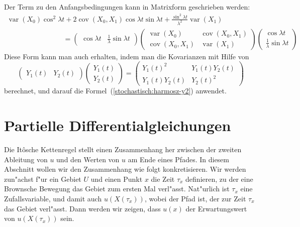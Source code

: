 Der Term zu den Anfangsbedingungen kann in Matrixform geschrieben
werden:
\begin{gather*}
\operatorname{var}(X_0)\cos^2\lambda t
+2\operatorname{cov}(X_0,X_1)\cos\lambda t\sin\lambda t
+
\frac{\sin^2\lambda t}{\lambda^2}\operatorname{var}(X_1)
\qquad
\qquad
\qquad
\qquad
\\
\qquad
\qquad
\qquad
\qquad
=
\begin{pmatrix}
\cos\lambda t&\frac1\lambda\sin\lambda t
\end{pmatrix}
\begin{pmatrix}
\operatorname{var}(X_0)    &\operatorname{cov}(X_0,X_1)\\
\operatorname{cov}(X_0,X_1)&\operatorname{var}(X_1)
\end{pmatrix}
\begin{pmatrix}
\cos\lambda t\\
\frac1\lambda\sin\lambda t
\end{pmatrix}
\end{gather*}
Diese Form kann man auch erhalten, indem man die Kovarianzen mit Hilfe von
\[
\begin{pmatrix} Y_1(t)&Y_2(t) \end{pmatrix}
\begin{pmatrix}
Y_1(t)\\
Y_2(t)
\end{pmatrix}
=
\begin{pmatrix}
Y_1(t)^2&Y_1(t)Y_2(t)\\
Y_1(t)Y_2(t)&Y_2(t)^2
\end{pmatrix}
\]
berechnet, und darauf die Formel~(\ref{stochastisch:harmosz-y2}) anwendet.

%
%
\section{Partielle Differentialgleichungen\label{section:pdgl}}
Die It\^osche Kettenregel stellt einen Zusammenhang her zwischen der zweiten
Ableitung von $u$ und den Werten von $u$ am Ende eines Pfades.
In diesem Abschnitt wollen wir den Zusammenhang wie folgt konkretisieren.
Wir werden zun"achst f"ur ein Gebiet $U$ und einen Punkt $x$ die
Zeit $\tau_x$ definieren, zu der eine Brownsche Bewegung das Gebiet zum
ersten Mal verl"asst.
Nat"urlich ist $\tau_x$ eine Zufallsvariable, und damit auch $u(X(\tau_x))$,
wobei der Pfad ist, der zur Zeit $\tau_x$ das Gebiet verl"asst.
Dann werden wir zeigen, dass $u(x)$ der Erwartungswert von $u(X(\tau_x))$
sein.

